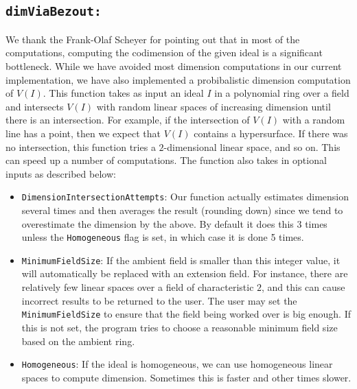\documentclass[11pt]{amsart}
\theoremstyle{definition}
\begin{document}
\subsection{\tt dimViaBezout:} 
\label{subsec.DimViaBezout}
We thank the Frank-Olaf Scheyer for pointing out that in most of the computations, computing the codimension of the given ideal is a significant bottleneck. While we have avoided most dimension computations in our current implementation, we have also implemented a probibalistic dimension computation of $V(I)$.
This function takes as input an ideal $I$ in a polynomial ring over a field and intersects $V(I)$ with random linear spaces of increasing dimension until there is an intersection.  For example, if the intersection of $V(I)$ with a random line has a point, then we expect that $V(I)$ contains a hypersurface.  If there was no intersection, this function tries a $2$-dimensional linear space, and so on.  This can speed up a number of computations.  The function also takes in optional inputs as described below:

\begin{itemize}
	\item {\tt DimensionIntersectionAttempts}: 
        Our function actually estimates dimension several times and then averages the result (rounding down) since we tend to overestimate the dimension by the above.  By default it does this 3 times unless the {\tt Homogeneous} flag is set, in which case it is done 5 times.
	\item {\tt MinimumFieldSize}:
	If the ambient field is smaller than this integer value, it will automatically be replaced with an extension field.  For instance, there are relatively few linear spaces over a field of characteristic $2$, and this can cause incorrect results to be returned to the user. The user may set the {\tt MinimumFieldSize} to ensure that the field being worked over is big enough.  If this is not set, the program tries to choose a reasonable minimum field size based on the ambient ring.
    \item {\tt Homogeneous}: 
    If the ideal is homogeneous, we can use homogeneous linear spaces to compute dimension. Sometimes this is faster and other times slower.
\end{itemize}
\end{document}
